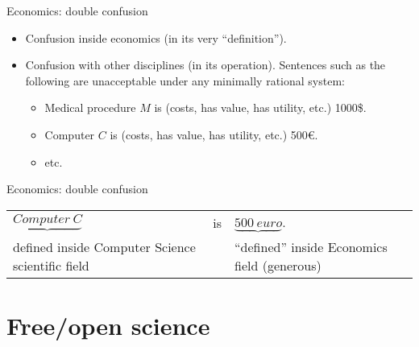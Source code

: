 \documentclass{beamer}
\begin{document}
\begin{frame}{Economics: double confusion}

\begin{itemize}
\item Confusion inside economics (in its very ``definition'').
\item Confusion with other disciplines (in its operation). Sentences such as the following are unacceptable under any minimally rational system:
	\begin{itemize}
	\item Medical procedure $M$ is (costs, has value, has utility, etc.) 1000\$.
	\item Computer $C$ is (costs, has value, has utility, etc.) 500€.
	\item etc.
	\end{itemize}
\end{itemize}
\end{frame}

\begin{frame}{Economics: double confusion}

{\Large
\begin{center}
\begin{tabular}{p{4cm} p{1cm} p{4cm}}
$\underbrace{Computer\ C}$ & is & $\underbrace{500\ euro}$.\\
 defined inside Computer Science scientific field & & ``defined'' inside Economics field (generous) \\
\end{tabular}
\end{center}

}

\end{frame}

\section{Free/open science}
\end{document}
